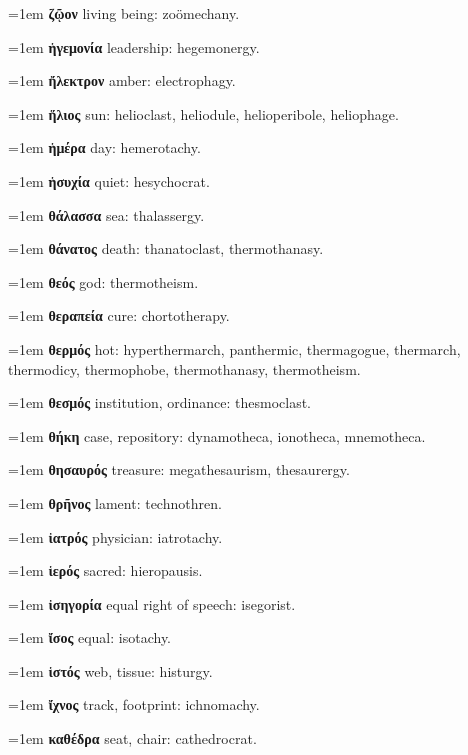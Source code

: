 \hangindent=1em \textbf{ζῷον} living being: zoömechany.\par
\hangindent=1em \textbf{ἡγεμονία} leadership: hegemonergy.\par
\hangindent=1em \textbf{ἤλεκτρον} amber: electrophagy.\par
\hangindent=1em \textbf{ἥλιος} sun: helioclast, heliodule, helioperibole, heliophage.\par
\hangindent=1em \textbf{ἡμέρα} day: hemerotachy.\par
\hangindent=1em \textbf{ἡσυχία} quiet: hesychocrat.\par
\hangindent=1em \textbf{θάλασσα} sea: thalassergy.\par
\hangindent=1em \textbf{θάνατος} death: thanatoclast, thermothanasy.\par
\hangindent=1em \textbf{θεός} god: thermotheism.\par
\hangindent=1em \textbf{θεραπεία} cure: chortotherapy.\par
\hangindent=1em \textbf{θερμός} hot: hyperthermarch, panthermic, thermagogue, thermarch, thermodicy, thermophobe, thermothanasy, thermotheism.\par
\hangindent=1em \textbf{θεσμός} institution, ordinance: thesmoclast.\par
\hangindent=1em \textbf{θήκη} case, repository: dynamotheca, ionotheca, mnemotheca.\par
\hangindent=1em \textbf{θησαυρός} treasure: megathesaurism, thesaurergy.\par
\hangindent=1em \textbf{θρῆνος} lament: technothren.\par
\hangindent=1em \textbf{ἰατρός} physician: iatrotachy.\par
\hangindent=1em \textbf{ἱερός} sacred: hieropausis.\par
\hangindent=1em \textbf{ἰσηγορία} equal right of speech: isegorist.\par
\hangindent=1em \textbf{ἴσος} equal: isotachy.\par
\hangindent=1em \textbf{ἱστός} web, tissue: histurgy.\par
\hangindent=1em \textbf{ἴχνος} track, footprint: ichnomachy.\par
\hangindent=1em \textbf{καθέδρα} seat, chair: cathedrocrat.\par
